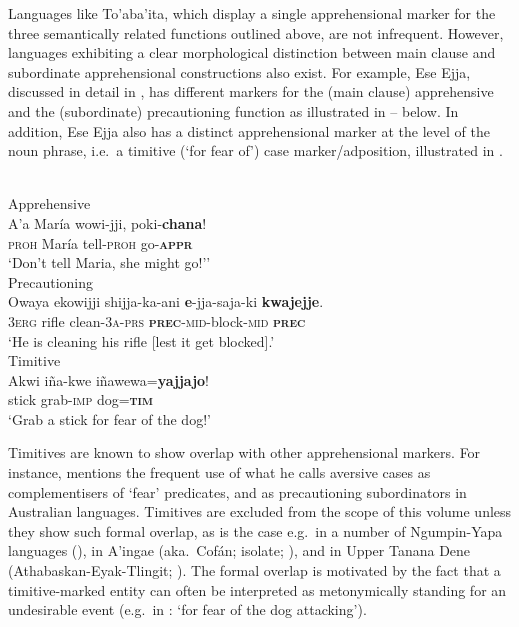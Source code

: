 \documentclass[output=paper,colorlinks,citecolor=brown
]{langscibook}
\begin{document}
 Languages like To'aba'ita, which display a single apprehensional marker for the three semantically related functions outlined above, are not infrequent. However, languages exhibiting a clear morphological distinction between main clause and subordinate apprehensional constructions also exist. For example, Ese Ejja, discussed in detail in \citet{vuillermet2018a}, has different markers for the (main clause) apprehensive and the (subordinate) precautioning function as illustrated in -- below. In addition, Ese Ejja also has a distinct apprehensional marker at the level of the noun phrase, i.e.\ a timitive (`for fear of') case marker/adposition, illustrated in .


\ea 
\label{ex:intro5}
\\
\ea \label{ex:intro5a} \textnormal{Apprehensive} \\
\gll A'a María wowi-jji, poki-\textbf{chana}! \\
\textsc{proh} María tell-\textsc{proh} go-\textsc{\textbf{appr}} \\
\glt `Don't tell Maria, she might go!'' \\
\ex \label{ex:intro5b} \textnormal{Precautioning} \\
\gll Owaya ekowijji shijja-ka-ani {\ob}\textbf{e}-jja-saja-ki \textbf{kwajejje}{\cb}. \\
\textsc{3erg} rifle clean-3\textsc{a-prs} \textsc{\textbf{prec}-mid}-block-\textsc{mid} \textsc{\textbf{prec}} \\
\glt `He is cleaning his rifle [lest it get blocked].' \\
    \ex \label{ex:intro5c} \textnormal{Timitive} \\
\gll Akwi iña-kwe iñawewa=\textbf{yajjajo}! \\
stick grab-\textsc{imp} dog=\textsc{\textbf{tim}} \\
\glt `Grab a stick for fear of the dog!'
\z
\z

 Timitives are known to show overlap with other apprehensional markers. For instance, \citet[74, 88]{dixon2009} mentions the frequent use of what he calls aversive cases as complementisers of `fear' predicates, and as precautioning subordinators in Australian languages. Timitives are excluded from the scope of this volume unless they show such formal overlap, as is the case e.g.\ in a number of Ngumpin-Yapa languages (\citealt{chapters/browne}), in A'ingae (aka.\ Cofán; isolate; \citealt{chapters/dabkowski-anderbois}), and in Upper Tanana Dene (Athabaskan-Eyak-Tlingit; \citealt{chapters/lovick}). The formal overlap is motivated by the fact that a timitive-marked entity can often be interpreted as metonymically standing for an undesirable event (e.g.\ in : `for fear of the dog attacking').
\end{document}
